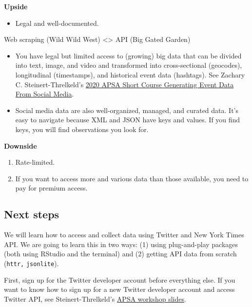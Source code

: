 \documentclass[
]{book}
\providecommand{\tightlist}{%
  \setlength{\itemsep}{0pt}\setlength{\parskip}{0pt}}
\begin{document}
\textbf{Upside}

\begin{itemize}
\tightlist
\item
  Legal and well-documented.
\end{itemize}

Web scraping (Wild Wild West) \textless\textgreater{} API (Big Gated Garden)

\begin{itemize}
\item
  You have legal but limited access to (growing) big data that can be divided into text, image, and video and transformed into cross-sectional (geocodes), longitudinal (timestamps), and historical event data (hashtags). See Zachary C. Steinert-Threlkeld's \href{https://github.com/ZacharyST/APSA2020_EventDataFromSocialMedia}{2020 APSA Short Course Generating Event Data From Social Media}.
\item
  Social media data are also well-organized, managed, and curated data. It's easy to navigate because XML and JSON have keys and values. If you find keys, you will find observations you look for.
\end{itemize}

\textbf{Downside}

\begin{enumerate}
\def\labelenumi{\arabic{enumi}.}
\item
  Rate-limited.
\item
  If you want to access more and various data than those available, you need to pay for premium access.
\end{enumerate}

\hypertarget{next-steps}{%
\subsection{Next steps}\label{next-steps}}

We will learn how to access and collect data using Twitter and New York Times API. We are going to learn this in two ways: (1) using plug-and-play packages (both using RStudio and the terminal) and (2) getting API data from scratch (\texttt{httr,} \texttt{jsonlite}).

First, sign up for the Twitter developer account before everything else. If you want to know how to sign up for a new Twitter developer account and access Twitter API, see Steinert-Threlkeld's \href{https://github.com/ZacharyST/APSA2020_EventDataFromSocialMedia/blob/master/Presentation/02_AccessTwitter.pdf}{APSA workshop slides}.
\end{document}
